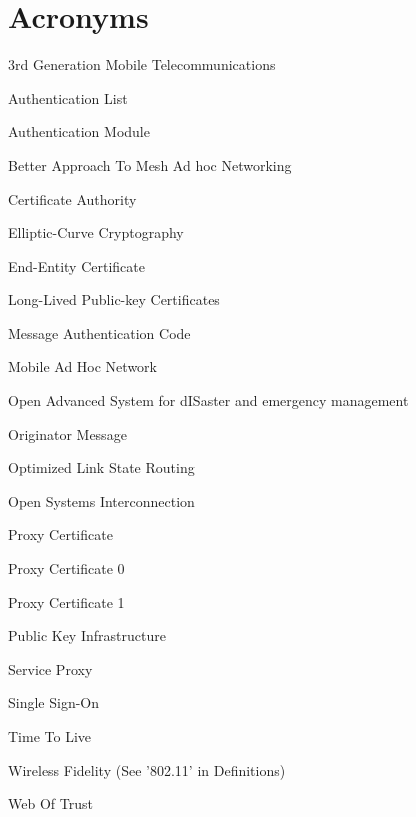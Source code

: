 \chapter*{Acronyms}

\begin{acronym}

 {3rd Generation Mobile Telecommunications}


 {Authentication List}

 {Authentication Module}

 {Better Approach To Mesh Ad hoc Networking}

 {Certificate Authority}





 {Elliptic-Curve Cryptography}

 {End-Entity Certificate}

 {Long-Lived Public-key Certificates}

 {Message Authentication Code}

 {Mobile Ad Hoc Network}


 {Open Advanced System for dISaster and emergency management}

 {Originator Message}

 {Optimized Link State Routing}

 {Open Systems Interconnection}

 {Proxy Certificate}

 {Proxy Certificate 0}

 {Proxy Certificate 1}


 {Public Key Infrastructure}



 {Service Proxy}

 {Single Sign-On}

 {Time To Live}


 {Wireless Fidelity (See '802.11' in Definitions)}

 {Web Of Trust}

\end{acronym}
